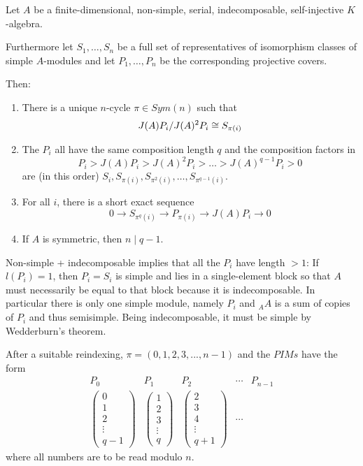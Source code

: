 \documentclass[fontsize=11pt,fleqn,a4paper]{scrartcl}
\begin{document}
\begin{theorem}[11.3.4]
Let $A$ be a finite-dimensional, non-simple, serial, indecomposable, self-injective $K$-algebra.

Furthermore let $S_1, \ldots, S_n$ be a full set of representatives of isomorphism classes of simple $A$-modules and let $P_1,\ldots, P_n$ be the corresponding projective covers.

Then:
\begin{enumerate}
\item There is a unique $n$-cycle $\pi\in Sym(n)$ such that
\[J(A)P_i / J(A)^2P_i \cong S_{\pi(i)}\]
\item The $P_i$ all have the same composition length $q$ and the composition factors in
\[P_i > J(A)P_i > J(A)^2P_i > \ldots > J(A)^{q-1}P_i > 0\]
are (in this order) $S_i, S_{\pi(i)}, S_{\pi^2(i)}, \ldots, S_{\pi^{q-1}(i)}$.
\item For all $i$, there is a short exact sequence
\[0 \to S_{\pi^q(i)} \to P_{\pi(i)} \to J(A)P_i \to 0\]
\item If $A$ is symmetric, then $n \mid q-1$.
\end{enumerate}
\end{theorem}

\begin{remark}
Non-simple + indecomposable implies that all the $P_i$ have length $>1$: If $l(P_i)=1$, then $P_i=S_i$ is simple and lies in a single-element block so that $A$ must necessarily be equal to that block because it is indecomposable. In particular there is only one simple module, namely $P_i$ and ${_A A}$ is a sum of copies of $P_i$ and thus semisimple. Being indecomposable, it must be simple by Wedderburn's theorem.
\end{remark}

\begin{remark}
After a suitable reindexing, $\pi=(0,1,2,3,...,n-1)$ and the $PIMs$ have the form
\[\begin{array}{ccccc}
P_0 &  P_1 & P_2 & \cdots & P_{n-1} \\
\hline
\begin{pmatrix}0\\1\\2\\\vdots\\q-1\end{pmatrix} &
\begin{pmatrix}1\\2\\3\\\vdots\\q\end{pmatrix} &
\begin{pmatrix}2\\3\\4\\\vdots\\q+1\end{pmatrix} &
\cdots &
\end{array}\]
where all numbers are to be read modulo $n$.
\end{remark}
\end{document}
